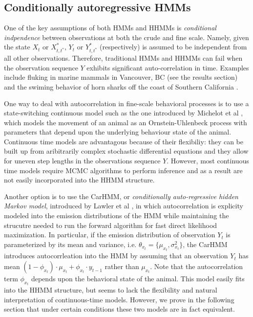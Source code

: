 \subsection{Conditionally autoregressive HMMs}

One of the key assumptions of both HMMs and HHMMs is \textit{conditional indpendence} between observations at both the crude and fine scale. Namely, given the state $X_t$ or $X^*_{t,t^*}$, $Y_t$ or $Y^*_{t,t^*}$ (respectively) is assumed to be independent from all other observations. Therefore, traditional HMMs and HHMMs can fail when the observation sequence $Y$ exhibits significant auto-correlation in time. Examples include fluking in marine mammals in Vancouver, BC (see the results section) and the swiming behavior of horn sharks off the coast of Southern California \cite{Adam:2019}.

One way to deal with autocorrelation in fine-scale behavioral processes is to use a state-switching continuous model such as the one introduced by Michelot et al \cite{Michelot:2019}, which models the movement of an animal as an Ornstein-Uhlenbeck process with parameters that depend upon the underlying behaviour state of the animal. Continuous time models are advantagous because of their flexibiliy: they can be built up from aribitrarily complex stochastic differential equations and they allow for uneven step lengths in the observations sequence $Y$. However, most continuous time models require MCMC algorithms to perform inference and as a result are not easily incorporated into the HHMM structure.

Another option is to use the CarHMM, or \textit{conditionally auto-regressive hidden Markov model}, introduced by Lawler et al \cite{Lawler:2019}, in which autocorrelation is explicity modeled into the emission distributions of the HMM while maintaining the strucutre needed to run the forward algorithm for fast direct likelihood maximization. In particular, if the emission distribution of observation $Y_t$ is parameterized by its mean and variance, i.e. $\theta_{x_t} = \{\mu_{x_t},\sigma^2_{x_t}\}$, the CarHMM introduces autocorrleation into the HMM by assuming that an observation $Y_t$ has mean $(1-\phi_{x_t}) \cdot \mu_{x_t} + \phi_{x_t} \cdot y_{t-1}$ rather than $\mu_{x_t}$. Note that the autocorrelation term $\phi_{x_t}$ depends upon the behavioral state of the animal. This model easily fits into the HHMM structure, but seems to lack the flexibility and natural interpretation of continuous-time models. However, we prove in the following section that under certain conditions these two models are in fact equivalent.

